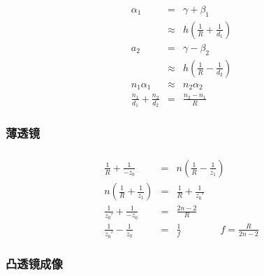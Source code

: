\documentclass{beamer}
\begin{document}
{{{{\begin{frame}
  
  \begin{eqnarray*}
    \alpha_1 & = & \gamma + \beta_1\\
    & \approx & h \left( \frac{1}{R} + \frac{1}{d_1} \right)\\
    a_2 & = & \gamma - \beta_2\\
    & \approx & h \left( \frac{1}{R} - \frac{1}{d_2} \right)\\
    n_1 \alpha_1 & \approx & n_2 \alpha_2\\
    \frac{n_1}{d_1} + \frac{n_2}{d_2} & = & \frac{n_2 - n_1}{R}
  \end{eqnarray*}
  
\end{frame}}{\begin{frame}
  \frametitle{薄透镜}
  
\end{frame}}{\begin{frame}
  \frametitle{}
  \begin{eqnarray*}
    \frac{1}{R} + \frac{1}{- z_0} & = & n \left( \frac{1}{R} - \frac{1}{z_1}
    \right)\\
    n \left( \frac{1}{R} + \frac{1}{z_1} \right) & = & \frac{1}{R} +
    \frac{1}{z_0'}\\
    \frac{1}{z_0'} + \frac{1}{- z_0} & = & \frac{2 n - 2}{R}\\
    \frac{1}{z_0'} - \frac{1}{z_0} & = & \frac{1}{f} \hspace{4em} f =
    \frac{R}{2 n - 2}
  \end{eqnarray*}
\end{frame}}{\begin{frame}
  \frametitle{凸透镜成像}
  
  \
  

\end{frame}}}}}
\end{document}
